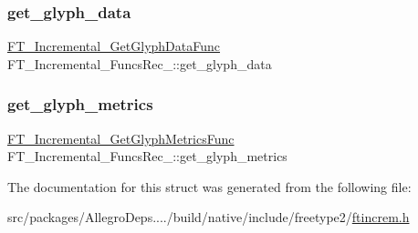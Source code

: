 \mbox{\label{struct_f_t___incremental___funcs_rec___ac276b7ff9624b8d8bf144ab8d00538b4}} 
\subsubsection{\texorpdfstring{get\+\_\+glyph\+\_\+data}{get\_glyph\_data}}
{\footnotesize\ttfamily \hyperlink{ftincrem_8h_ac6b537b5cb4b97b05cae225e24e85720}{F\+T\+\_\+\+Incremental\+\_\+\+Get\+Glyph\+Data\+Func} F\+T\+\_\+\+Incremental\+\_\+\+Funcs\+Rec\+\_\+\+::get\+\_\+glyph\+\_\+data}

\mbox{\label{struct_f_t___incremental___funcs_rec___ac7d95e85357ab9d1893660b0628c1908}} 
\subsubsection{\texorpdfstring{get\+\_\+glyph\+\_\+metrics}{get\_glyph\_metrics}}
{\footnotesize\ttfamily \hyperlink{ftincrem_8h_a3bd123a916bc132ec44104eab2e52a3f}{F\+T\+\_\+\+Incremental\+\_\+\+Get\+Glyph\+Metrics\+Func} F\+T\+\_\+\+Incremental\+\_\+\+Funcs\+Rec\+\_\+\+::get\+\_\+glyph\+\_\+metrics}



The documentation for this struct was generated from the following file\+:\begin{DoxyCompactItemize}
\item 
src/packages/\+Allegro\+Deps..../build/native/include/freetype2/\hyperlink{ftincrem_8h}{ftincrem.\+h}\end{DoxyCompactItemize}
